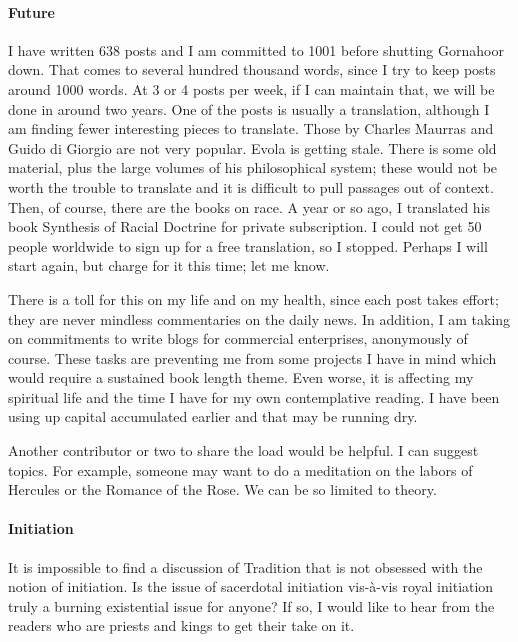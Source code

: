 \paragraph{Future}


I have written 638 posts and I am committed to 1001 before shutting Gornahoor down. That comes to several hundred thousand words, since I try to keep posts around 1000 words. At 3 or 4 posts per week, if I can maintain that, we will be done in around two years. One of the posts is usually a translation, although I am finding fewer interesting pieces to translate. Those by Charles Maurras and Guido di Giorgio are not very popular. Evola is getting stale. There is some old material, plus the large volumes of his philosophical system; these would not be worth the trouble to translate and it is difficult to pull passages out of context. Then, of course, there are the books on race. A year or so ago, I translated his book Synthesis of Racial Doctrine for private subscription. I could not get 50 people worldwide to sign up for a free translation, so I stopped. Perhaps I will start again, but charge for it this time; let me know.

There is a toll for this on my life and on my health, since each post takes effort; they are never mindless commentaries on the daily news. In addition, I am taking on commitments to write blogs for commercial enterprises, anonymously of course. These tasks are preventing me from some projects I have in mind which would require a sustained book length theme. Even worse, it is affecting my spiritual life and the time I have for my own contemplative reading. I have been using up capital accumulated earlier and that may be running dry.

Another contributor or two to share the load would be helpful. I can suggest topics. For example, someone may want to do a meditation on the labors of Hercules or the Romance of the Rose. We can be so limited to theory.

\paragraph{Initiation}


It is impossible to find a discussion of Tradition that is not obsessed with the notion of initiation. Is the issue of sacerdotal initiation vis-à-vis royal initiation truly a burning existential issue for anyone? If so, I would like to hear from the readers who are priests and kings to get their take on it.

